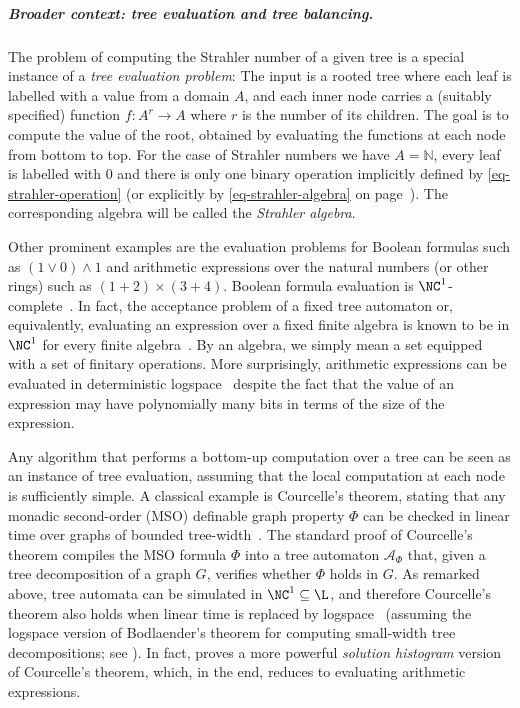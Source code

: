 \documentclass[a4paper,UKenglish,cleveref, autoref, thm-restate, numberwithinsect]{lipics-v2021}
\begin{document}
 \subparagraph{Broader context: tree evaluation and tree balancing.}
 The problem of computing the Strahler number of a given tree is a special instance of a  \emph{tree evaluation problem}:
The input is a rooted tree where each leaf is labelled with a value from a domain $A$,
and each inner node carries a (suitably specified) function $f \colon A^r \to A$ where $r$ is the number of its children.
The goal is to compute the value of the root, obtained by evaluating the functions at each node from bottom to top.
For the case of Strahler numbers we have $A = \mathbb{N}$, every leaf is labelled with $0$ and there 
 is only one binary operation implicitly defined by \eqref{eq-strahler-operation} (or explicitly by  \eqref{eq-strahler-algebra} on page~\pageref{page-st}).
 The corresponding algebra will be called the \emph{Strahler algebra}.

Other prominent examples are the evaluation problems for Boolean formulas such as $(1 \vee 0) \wedge 1$
and arithmetic expressions over the natural numbers (or other rings) such as $(1 + 2) \times (3 + 4)$.
Boolean formula evaluation is $\NC^1$-complete~\cite{Bus87}.
In fact, the acceptance problem of a fixed tree automaton or, equivalently, evaluating an expression over a fixed finite algebra
is known to be in $\NC^1$ for every finite algebra~\cite{GanardiL19,Loh01rta}.
By an algebra, we simply mean a set equipped with a set of finitary operations.
More surprisingly, arithmetic expressions can be evaluated in deterministic logspace~\cite{Ben-OrC92,BCGR92,ChiuDL01}
despite the fact that the value of an expression may have polynomially many bits in terms of the size of the expression.

Any algorithm that performs a bottom-up computation over a tree can
be seen as an instance of tree evaluation,
assuming that the local computation at each node is sufficiently simple.
A classical example is Courcelle's theorem, stating that any 
monadic second-order (MSO) definable graph property $\Phi$ can be checked in linear time
over graphs of bounded tree-width~\cite{Courcelle90}.
The standard proof of Courcelle's theorem compiles the MSO formula $\Phi$ into a tree automaton
$\mathcal{A}_\Phi$ that, given a tree decomposition of a graph $G$, verifies
whether $\Phi$ holds in $G$.
As remarked above, tree automata can be simulated in $\NC^1 \subseteq \L$,
and therefore Courcelle's theorem also holds when linear time is replaced by logspace~\cite{ElberfeldJT10}
(assuming the logspace version of Bodlaender's theorem for computing small-width tree decompositions; see \cite{ElberfeldJT10}).
In fact, \cite{ElberfeldJT10} proves a more powerful \emph{solution histogram} version of Courcelle's theorem,
which, in the end, reduces to evaluating arithmetic expressions. 
\end{document}

